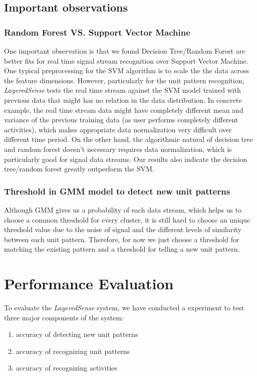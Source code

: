 \documentclass[a4paper, 10pt, conference]{IEEEtran}      %
\begin{document}
\subsection{Important observations}
\subsubsection{Random Forest VS. Support Vector Machine} 
One important observation is that we found Decision Tree/Random Forest are better fits for real time signal stream recognition over Support Vector Machine. One typical preprocessing for the SVM algorithm is to scale the the data across the feature dimensions. However, particularly for the unit pattern recognition, \emph{LayeredSense} tests the real time stream against the SVM model trained with previous data that might has no relation in the data distribution. In concrete example, the real time stream data might have completely different mean and variance of the previous training data (as user performs completely different activities), which makes appropriate data normalization very difficult over different time period. On the other hand, the algorithmic natural of decision tree and random forest doesn't necessary requires data normalization, which is particularly good for signal data streams. Our results also indicate the decision tree/random forest greatly outperform the SVM. 
\subsubsection{Threshold in GMM model to detect new unit patterns}
Although GMM gives us a probability of each data stream, which helps us to choose a common threshold for every cluster, it is still hard to choose an unique threshold value due to the noise of signal and the different levels of similarity between each unit pattern. Therefore, for now we just choose a threshold for matching the existing pattern and a threshold for telling a new unit pattern. 

\section{Performance Evaluation}
To evaluate the \emph{LayeredSense} system, we have conducted a experiment to test three major components of the system:

\begin{enumerate}
\item accuracy of detecting new unit patterns
\item accuracy of recognizing unit patterns
\item accuracy of recognizing activities
\end {enumerate}
\end{document}
